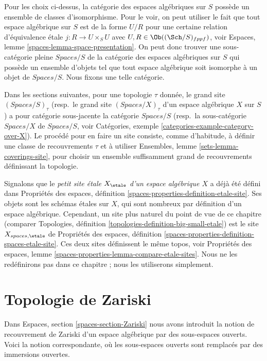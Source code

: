 \medskip\noindent
Pour les choix ci-dessus, la catégorie des espaces algébriques sur $S$
possède un ensemble de classes d'isomorphisme. Pour le voir, on peut utiliser le
fait que tout espace algébrique sur $S$ est de la forme $U/R$ pour
une certaine relation d'équivalence \'etale $j : R \to U \times_S U$ avec
$U, R \in \Ob((\Sch/S)_{fppf})$, voir
Espaces, lemme \ref{spaces-lemma-space-presentation}.
On peut donc trouver une sous-catégorie pleine $\textit{Spaces}/S$ de la catégorie des
espaces algébriques sur $S$ qui possède un ensemble d'objets
tel que tout espace algébrique soit isomorphe à un objet de
$\textit{Spaces}/S$. Nous fixons une telle catégorie.

\medskip\noindent
Dans les sections suivantes, pour une topologie $\tau$ donnée, le grand site
$(\textit{Spaces}/S)_\tau$ (resp.\ le grand site $(\textit{Spaces}/X)_\tau$
d'un espace algébrique $X$ sur $S$)
a pour catégorie sous-jacente la catégorie $\textit{Spaces}/S$
(resp.\ la sous-catégorie $\textit{Spaces}/X$ de $\textit{Spaces}/S$, voir
Catégories, exemple \ref{categories-example-category-over-X}).
Le procédé pour en faire un site consiste, comme d'habitude, à définir une
classe de recouvrements $\tau$ et à utiliser
Ensembles, lemme \ref{sets-lemma-coverings-site},
pour choisir un ensemble suffisamment grand de recouvrements définissant la topologie.

\medskip\noindent
Signalons que le {\it petit site \'etale $X_\etale$
d'un espace algébrique $X$} a déjà été défini dans
Propriétés des espaces, définition
\ref{spaces-properties-definition-etale-site}.
Ses objets sont les schémas \'etales sur $X$, qui sont nombreux
par définition d'un espace algébrique. Cependant,
un site plus naturel du point de vue de ce chapitre (comparer
Topologies, définition \ref{topologies-definition-big-small-etale})
est le site $X_{spaces, \etale}$ de
Propriétés des espaces, définition
\ref{spaces-properties-definition-spaces-etale-site}.
Ces deux sites définissent le même topos, voir
Propriétés des espaces, lemme \ref{spaces-properties-lemma-compare-etale-sites}.
Nous ne les redéfinirons pas dans ce chapitre ; nous les
utiliserons simplement.






\section{Topologie de Zariski}
\label{section-zariski}

\noindent
Dans
Espaces, section \ref{spaces-section-Zariski}
nous avons introduit la notion de recouvrement de Zariski d'un espace algébrique par
des sous-espaces ouverts. Voici la notion correspondante, où les sous-espaces ouverts
sont remplacés par des immersions ouvertes.

